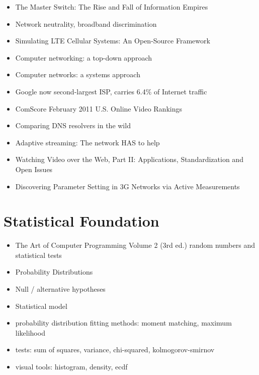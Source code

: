 \begin{itemize}
\item The Master Switch: The Rise and Fall of Information Empires \cite{wu2010master}
\item Network neutrality, broadband discrimination \cite{wu2003network}
\item Simulating LTE Cellular Systems: An Open-Source Framework \cite{5634134}
\item Computer networking: a top-down approach \cite{kurose2008computer}
\item Computer networks: a systems approach \cite{peterson2007computer}
\item Google now second-largest ISP, carries 6.4\% of Internet traffic \cite{nw2010carrier}
\item ComScore February 2011 U.S. Online Video Rankings \cite{comscore2011ranking}
\item Comparing DNS resolvers in the wild \cite{ager2010comparing}
\item Adaptive streaming: The network HAS to help \cite{BLTJ:BLTJ20505}
\item Watching Video over the Web, Part II: Applications, Standardization and Open Issues \cite{watching-video2}
\item Discovering Parameter Setting in 3G Networks via Active Measurements \cite{4640935}
\end{itemize}

\section{Statistical Foundation}

\begin{itemize}
\item The Art of Computer Programming Volume 2 (3rd ed.) random numbers and statistical tests\cite{Knuth:1997:ACP:270146}
\item Probability Distributions
\item Null / alternative hypotheses
\item Statistical model
\item probability distribution fitting
		methods: moment matching, maximum likelihood
\item tests: sum of squares, variance, chi-squared, kolmogorov-smirnov
\item visual tools: histogram, density, ecdf

\end{itemize}

